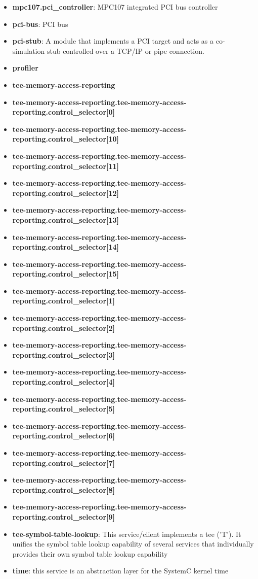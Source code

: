 \begin{itemize}
\item \textbf{mpc107.pci\_controller}: MPC107 integrated PCI bus controller
\item \textbf{pci-bus}: PCI bus
\item \textbf{pci-stub}: A module that implements a PCI target and acts as a co-simulation stub controlled over a TCP/IP or pipe connection.
\item \textbf{profiler}
\item \textbf{tee-memory-access-reporting}
\item \textbf{tee-memory-access-reporting.tee-memory-access-reporting.control\_selector[0]}
\item \textbf{tee-memory-access-reporting.tee-memory-access-reporting.control\_selector[10]}
\item \textbf{tee-memory-access-reporting.tee-memory-access-reporting.control\_selector[11]}
\item \textbf{tee-memory-access-reporting.tee-memory-access-reporting.control\_selector[12]}
\item \textbf{tee-memory-access-reporting.tee-memory-access-reporting.control\_selector[13]}
\item \textbf{tee-memory-access-reporting.tee-memory-access-reporting.control\_selector[14]}
\item \textbf{tee-memory-access-reporting.tee-memory-access-reporting.control\_selector[15]}
\item \textbf{tee-memory-access-reporting.tee-memory-access-reporting.control\_selector[1]}
\item \textbf{tee-memory-access-reporting.tee-memory-access-reporting.control\_selector[2]}
\item \textbf{tee-memory-access-reporting.tee-memory-access-reporting.control\_selector[3]}
\item \textbf{tee-memory-access-reporting.tee-memory-access-reporting.control\_selector[4]}
\item \textbf{tee-memory-access-reporting.tee-memory-access-reporting.control\_selector[5]}
\item \textbf{tee-memory-access-reporting.tee-memory-access-reporting.control\_selector[6]}
\item \textbf{tee-memory-access-reporting.tee-memory-access-reporting.control\_selector[7]}
\item \textbf{tee-memory-access-reporting.tee-memory-access-reporting.control\_selector[8]}
\item \textbf{tee-memory-access-reporting.tee-memory-access-reporting.control\_selector[9]}
\item \textbf{tee-symbol-table-lookup}: This service/client implements a tee ('T'). It unifies the symbol table lookup capability of several services that individually provides their own symbol table lookup capability
\item \textbf{time}: this service is an abstraction layer for the SystemC kernel time
\end{itemize}
